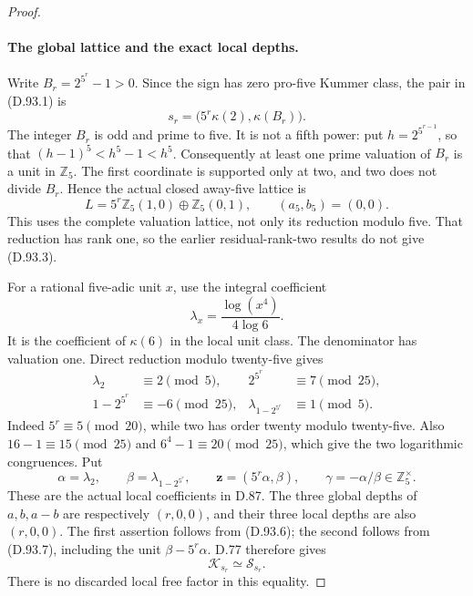 \begin{proof}
\paragraph{The global lattice and the exact local depths.}
Write \(B_r=2^{5^r}-1>0\). Since the sign has zero pro-five
Kummer class, the pair in (D.93.1) is
\[
        s_r=\bigl(5^r\kappa(2),\kappa(B_r)\bigr).
                                                               \tag{D.93.5}
\]
The integer \(B_r\) is odd and prime to five. It is not a
fifth power: put \(h=2^{5^{r-1}}\), so that
\((h-1)^5<h^5-1<h^5\). Consequently at least one prime
valuation of \(B_r\) is a unit in \(\mathbb Z_5\).
The first coordinate is supported only at two, and two does
not divide \(B_r\). Hence the actual closed away-five lattice is
\[
        L=5^r\mathbb Z_5(1,0)\oplus\mathbb Z_5(0,1),
             \qquad (a_5,b_5)=(0,0).                  \tag{D.93.6}
\]
This uses the complete valuation lattice, not only its reduction
modulo five. That reduction has rank one, so the earlier
residual-rank-two results do not give (D.93.3).

For a rational five-adic unit \(x\), use the integral coefficient
\[
                   \lambda_x=\frac{\log(x^4)}{4\log6}.
\]
It is the coefficient of \(\kappa(6)\) in the local unit class.
The denominator has valuation one. Direct reduction modulo
twenty-five gives
\[
 \begin{aligned}
 \lambda_2&\equiv2\pmod5,&
 2^{5^r}&\equiv7\pmod{25},\\
 1-2^{5^r}&\equiv-6\pmod{25},&
 \lambda_{1-2^{5^r}}&\equiv1\pmod5.
 \end{aligned}                                      \tag{D.93.7}
\]
Indeed \(5^r\equiv5\pmod{20}\), while two has order twenty
modulo twenty-five. Also
\(16-1\equiv15\pmod{25}\) and \(6^4-1\equiv20\pmod{25}\),
which give the two logarithmic congruences.
Put
\[
 \alpha=\lambda_2,\qquad
 \beta=\lambda_{1-2^{5^r}},\qquad
 \mathbf z=(5^r\alpha,\beta),\qquad
 \gamma=-\alpha/\beta\in\mathbb Z_5^\times .
                                                               \tag{D.93.8}
\]
These are the actual local coefficients in D.87.
The three global depths of \(a,b,a-b\) are respectively
\((r,0,0)\), and their three local depths are also \((r,0,0)\).
The first assertion follows from (D.93.6); the second follows
from (D.93.7), including the unit \(\beta-5^r\alpha\).
D.77 therefore gives
\[
                       \mathcal K_{s_r}\simeq
                       \mathcal S_{s_r}.              \tag{D.93.9}
\]
There is no discarded local free factor in this equality.


\end{proof}
